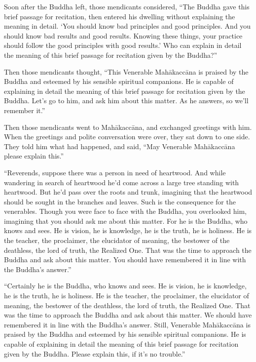 \documentclass[12pt,openany]{book}%
\begin{document}
Soon after the Buddha left, those mendicants considered, “The Buddha gave this brief passage for recitation, then entered his dwelling without explaining the meaning in detail. ‘You should know bad principles and good principles. And you should know bad results and good results. Knowing these things, your practice should follow the good principles with good results.’ Who can explain in detail the meaning of this brief passage for recitation given by the Buddha?” 

Then those mendicants thought, “This Venerable \textsanskrit{Mahākaccāna} is praised by the Buddha and esteemed by his sensible spiritual companions. He is capable of explaining in detail the meaning of this brief passage for recitation given by the Buddha. Let’s go to him, and ask him about this matter. As he answers, so we’ll remember it.” 

Then those mendicants went to \textsanskrit{Mahākaccāna}, and exchanged greetings with him. When the greetings and polite conversation were over, they sat down to one side. They told him what had happened, and said, “May Venerable \textsanskrit{Mahākaccāna} please explain this.” 

“Reverends, suppose there was a person in need of heartwood. And while wandering in search of heartwood he’d come across a large tree standing with heartwood. But he’d pass over the roots and trunk, imagining that the heartwood should be sought in the branches and leaves. Such is the consequence for the venerables. Though you were face to face with the Buddha, you overlooked him, imagining that you should ask me about this matter. For he is the Buddha, who knows and sees. He is vision, he is knowledge, he is the truth, he is holiness. He is the teacher, the proclaimer, the elucidator of meaning, the bestower of the deathless, the lord of truth, the Realized One. That was the time to approach the Buddha and ask about this matter. You should have remembered it in line with the Buddha’s answer.” 

“Certainly he is the Buddha, who knows and sees. He is vision, he is knowledge, he is the truth, he is holiness. He is the teacher, the proclaimer, the elucidator of meaning, the bestower of the deathless, the lord of truth, the Realized One. That was the time to approach the Buddha and ask about this matter. We should have remembered it in line with the Buddha’s answer. Still, Venerable \textsanskrit{Mahākaccāna} is praised by the Buddha and esteemed by his sensible spiritual companions. He is capable of explaining in detail the meaning of this brief passage for recitation given by the Buddha. Please explain this, if it’s no trouble.” 
\end{document}
